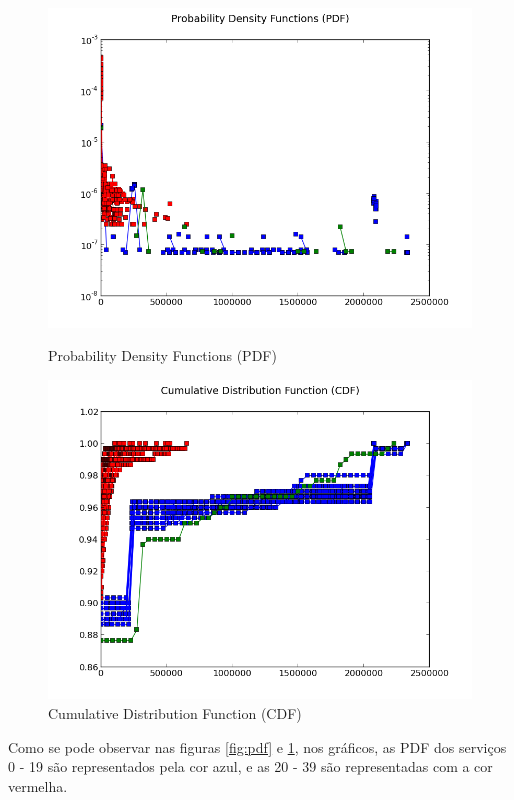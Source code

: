 \documentclass[pdftex,12pt,a4paper]{report}
\begin{document}
\begin{figure}[!htb]
  \centering
  \begin{minipage}[b]{0.4\textwidth}
    \includegraphics[width=\textwidth]{pdf_cdf/pdf.png}
    \caption{Probability Density Functions (PDF)}
    \label{fig:pdf}
  \end{minipage}
  \hfill
  \begin{minipage}[b]{0.4\textwidth}
    \includegraphics[width=\textwidth]{pdf_cdf/cdf.png}
    \caption{Cumulative Distribution Function (CDF)}
    \label{fig:cdf}
  \end{minipage}
\end{figure}

Como se pode observar nas figuras \ref{fig:pdf} e \ref{fig:cdf}, nos gráficos, as PDF dos serviços 0 - 19 são representados pela cor azul, e as 20 - 39 são representadas com a cor vermelha. 
\end{document}
